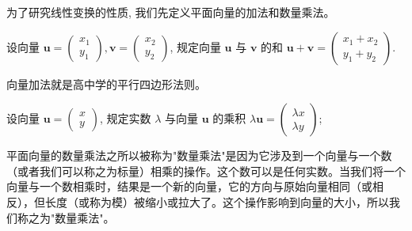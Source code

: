 为了研究线性变换的性质, 我们先定义平面向量的加法和数量乘法。

\begin{definition}[平面向量的加法]
  设向量 $\boldsymbol{u}=\left(\begin{array}{l}x_1 \\ y_1\end{array}\right), \boldsymbol{v}=\left(\begin{array}{l}x_2 \\ y_2\end{array}\right)$, 
  规定向量 $\boldsymbol{u}$ 与 $\boldsymbol{v}$ 的和 $\boldsymbol{u}+\boldsymbol{v}=\left(\begin{array}{l}x_1+x_2 \\ y_1+y_2\end{array}\right)$.
\end{definition}

\begin{note}
向量加法就是高中学的平行四边形法则。
\end{note}

\begin{definition}[平面向量的数量乘法]
  设向量 $\boldsymbol{u}=\left(\begin{array}{l}x \\ y\end{array}\right)$, 
  规定实数 $\lambda$ 与向量 $\boldsymbol{u}$ 的乘积 $\lambda \boldsymbol{u}=\left(\begin{array}{l}\lambda x \\ \lambda y\end{array}\right)$; 
\end{definition}

平面向量的数量乘法之所以被称为"数量乘法"是因为它涉及到一个向量与一个数（或者我们可以称之为标量）相乘的操作。这个数可以是任何实数。当我们将一个向量与一个数相乘时，结果是一个新的向量，它的方向与原始向量相同（或相反），但长度（或称为模）被缩小或拉大了。这个操作影响到向量的大小，所以我们称之为"数量乘法"。


